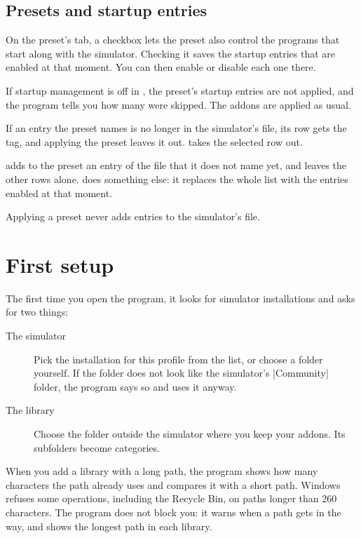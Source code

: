 \documentclass[11pt,a4paper]{article}
\begin{document}
\subsection{Presets and startup entries}
\label{sec:presets-startup}

On the preset's  tab, a checkbox lets the preset also control the
programs that start along with the simulator. Checking it saves the startup
entries that are enabled at that moment. You can then enable or disable each
one there.

If startup management is off in , the preset's startup entries are
not applied, and the program tells you how many were skipped. The addons are
applied as usual.

If an entry the preset names is no longer in the simulator's file, its row gets
the  tag, and applying the preset leaves it out.
 takes the selected row out.

 adds to the preset an entry of the file that it does not name
yet, and leaves the other rows alone.  does
something else: it replaces the whole list with the entries enabled at that
moment.

Applying a preset never adds entries to the simulator's file.

\section{First setup}

The first time you open the program, it looks for simulator installations and
asks for two things:

\begin{description}
  \item[The simulator] Pick the installation for this profile from the list, or
    choose a folder yourself. If the folder does not look like the simulator's
    \where|Community| folder, the program says so and uses it anyway.
  \item[The library] Choose the folder outside the simulator where you keep
    your addons. Its subfolders become categories.
\end{description}

When you add a library with a long path, the program shows how many characters
the path already uses and compares it with a short path. Windows refuses some
operations, including the Recycle Bin, on paths longer than 260 characters.
The program does not block you: it warns when a path gets in the way, and
 shows the longest path in each library.
\end{document}
